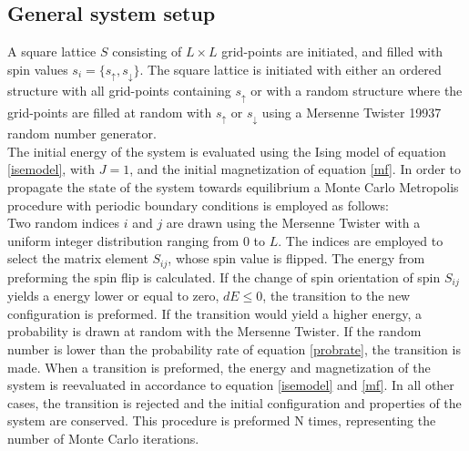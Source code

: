 \documentclass[%
reprint,nofootinbib,
amsmath,amssymb,
aps,
]{revtex4-1}
\begin{document}
\subsection*{General system setup} \noindent 
A square lattice $S$ consisting of $L\times L$ grid-points are initiated, and filled with spin values $s_i = \{s_\uparrow, s_\downarrow\}$.  The square lattice is initiated with either an ordered structure with all grid-points containing $s_\uparrow$  or with a random structure where the grid-points are filled at random with $s_\uparrow$ or $s_\downarrow$ using a Mersenne Twister 19937 random number generator. \\ 
\indent The initial energy of the system is evaluated using the Ising model of equation \ref{isemodel}, with $J = 1$, and the initial magnetization of equation \ref{mf}. In order to propagate the state of the system towards equilibrium a Monte Carlo Metropolis procedure with periodic boundary conditions is employed as follows: \\ 
\indent Two random indices $i$ and $j$ are drawn using the Mersenne Twister with a uniform integer distribution ranging from 0 to $L$. The indices are employed to select the matrix element $S_{ij}$, whose spin value is flipped. The energy from preforming the spin flip is calculated. If the change of spin orientation of spin $S_{ij}$ yields a energy lower or equal to zero, $dE \leq 0$, the transition to the new configuration is preformed. If the transition would yield a higher energy, a probability is drawn at random with the Mersenne Twister. If the random number is lower than the probability rate of equation \ref{probrate}, the transition is made. When a transition is preformed, the energy and magnetization of the system is reevaluated in accordance to equation \ref{isemodel} and \ref{mf}. In all other cases, the transition is rejected and the initial configuration and properties of the system are conserved. This procedure is preformed N times, representing the number of Monte Carlo iterations.\\ \indent
\end{document}
